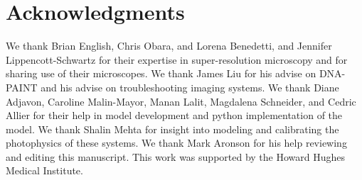 \section{Acknowledgments}
We thank Brian English, Chris Obara, and Lorena Benedetti, and Jennifer Lippencott-Schwartz for their expertise in
    super-resolution microscopy and for sharing use of their microscopes. 
    We thank James Liu for his advise on DNA-PAINT and his advise on troubleshooting imaging systems.
    We thank Diane Adjavon, Caroline Malin-Mayor, Manan Lalit, Magdalena Schneider, and Cedric Allier 
    for their help in model development and python implementation of the model. 
    We thank Shalin Mehta for insight into modeling and calibrating the photophysics of these systems.
    We thank Mark Aronson for his help reviewing and editing this manuscript. 
    This work was supported by the Howard Hughes Medical Institute. 